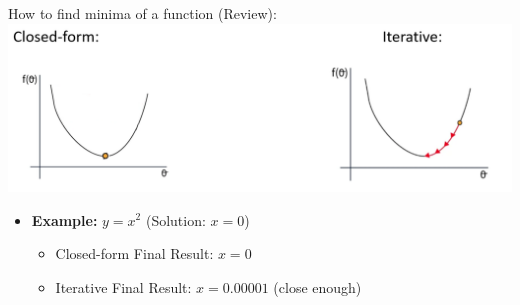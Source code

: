 \begin{frame}{How to find minima of a function (Review):}
    \centering
    \includegraphics[width=0.8\linewidth]{images/linear-regression/linear-regression-9.png}

    \begin{itemize}
        \item \textbf{Example:} $y = x^2$ \quad (Solution: $x = 0$)
        \begin{itemize}
            \item Closed-form Final Result: $x = 0$
            \item Iterative Final Result: $x = 0.00001$ (close enough)
        \end{itemize}
    \end{itemize}
\end{frame}


